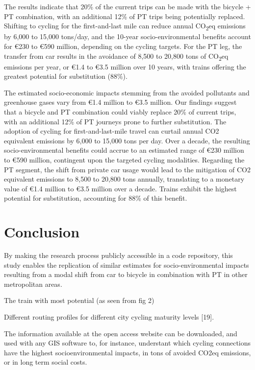 \documentclass[runningheads]{llncs}
\begin{document}
The results indicate that 20\% of the current trips can be made with the
bicycle + PT combination, with an additional 12\% of PT trips being
potentially replaced. Shifting to cycling for the first-and-last mile
can reduce annual CO\textsubscript{2}eq emissions by 6,000 to 15,000
tons/day, and the 10-year socio-environmental benefits account for €230
to €590 million, depending on the cycling targets. For the PT leg, the
transfer from car results in the avoidance of 8,500 to 20,800 tons of
CO\textsubscript{2}eq emissions per year, or €1.4 to €3.5 million over
10 years, with trains offering the greatest potential for substitution
(88\%).

The estimated socio-economic impacts stemming from the avoided
pollutants and greenhouse gases vary from €1.4 million to €3.5 million.
Our findings suggest that a bicycle and PT combination could viably
replace 20\% of current trips, with an additional 12\% of PT journeys
prone to further substitution. The adoption of cycling for
first-and-last-mile travel can curtail annual CO2 equivalent emissions
by 6,000 to 15,000 tons per day. Over a decade, the resulting
socio-environmental benefits could accrue to an estimated range of €230
million to €590 million, contingent upon the targeted cycling
modalities. Regarding the PT segment, the shift from private car usage
would lead to the mitigation of CO2 equivalent emissions to 8,500 to
20,800 tons annually, translating to a monetary value of €1.4 million to
€3.5 million over a decade. Trains exhibit the highest potential for
substitution, accounting for 88\% of this benefit.

\hypertarget{conclusion}{%
\section{Conclusion}\label{conclusion}}

By making the research process publicly accessible in a code repository,
this study enables the replication of similar estimates for
socio-environmental impacts resulting from a modal shift from car to
bicycle in combination with PT in other metropolitan areas.

The train with most potential (as seen from fig 2)

Different routing profiles for different city cycling maturity levels
{[}19{]}.

The information available at the open access website can be downloaded,
and used with any GIS software to, for instance, understant which
cycling connections have the highest socioenvironmental impacts, in tons
of avoided CO2eq emissions, or in long term social costs.
\end{document}
